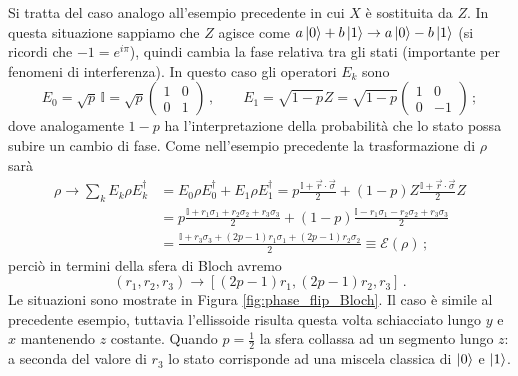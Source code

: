 \begin{esempio}\label{es:phase_flip}
    Si tratta del caso analogo all'esempio precedente in cui $X$ è sostituita da $Z$. In questa situazione sappiamo che $Z$ agisce come $a \ket{0} + b \ket{1} \rightarrow a \ket{0} - b \ket{1}$ (si ricordi che $-1 = e^{i \pi}$), quindi cambia la fase relativa tra gli stati (importante per fenomeni di interferenza). In questo caso gli operatori $E_k$ sono
    \begin{equation*}
        E_0 = \sqrt{p} \, \mathbb{I} = \sqrt{p}
        \begin{pmatrix}
            1 & 0 \\ 0 & 1
        \end{pmatrix} \, , \qquad
        E_1 = \sqrt{1-p} Z = \sqrt{1-p}
        \begin{pmatrix}
            1 & 0 \\ 0 & -1
        \end{pmatrix} \, ;
    \end{equation*}
    dove analogamente $1-p$ ha l'interpretazione della probabilità che lo stato possa subire un cambio di fase. Come nell'esempio precedente la trasformazione di $\rho$ sarà
    \begin{align*}
        \rho \rightarrow \sum_k E_k \rho E_k^\dag &= E_0 \rho E_0^\dag + E_1 \rho E_1^\dag = p \frac{\mathbb{I} + \vec{r} \cdot \vec{\sigma}}{2} + (1-p) Z \frac{\mathbb{I} + \vec{r} \cdot \vec{\sigma}}{2} Z \\
        &= p \frac{\mathbb{I} + r_1 \sigma_1 + r_2 \sigma_2 + r_3 \sigma_3}{2} + (1-p) \frac{\mathbb{I} - r_1 \sigma_1 - r_2 \sigma_2 + r_3 \sigma_3}{2} \\
        &= \frac{\mathbb{I} + r_3 \sigma_3 + (2p-1) r_1 \sigma_1 + (2p-1) r_2 \sigma_2}{2} \equiv \mathcal{E}(\rho) \, ;
    \end{align*}
    perciò in termini della sfera di Bloch avremo
    \begin{equation*}
        (r_1,r_2,r_3) \rightarrow \left[ (2p-1) r_1, (2p-1)r_2, r_3 \right] \, .
    \end{equation*}
    Le situazioni sono mostrate in Figura \ref{fig:phase_flip_Bloch}. Il caso è simile al precedente esempio, tuttavia l'ellissoide risulta questa volta schiacciato lungo $y$ e $x$ mantenendo $z$ costante. Quando $p = \frac{1}{2}$ la sfera collassa ad un segmento lungo $z$: a seconda del valore di $r_3$ lo stato corrisponde ad una miscela classica di $\ket{0}$ e $\ket{1}$. 
    \begin{figure}[!ht]

\end{figure}
\end{esempio}
